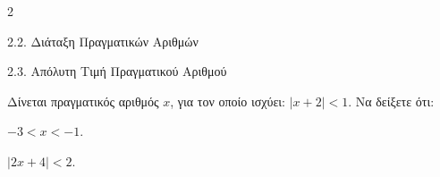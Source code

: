 \begin{ylh}{2}
    \item 2.2. Διάταξη Πραγματικών Αριθμών
    \item 2.3. Απόλυτη Τιμή Πραγματικού Αριθμού
\end{ylh}
Δίνεται πραγματικός αριθμός $x$, για τον οποίο ισχύει: $|x+2| < 1$. Να δείξετε ότι:
\begin{alist}
\item $-3 < x < -1$.
\item $|2x+4| < 2$.
\end{alist}

